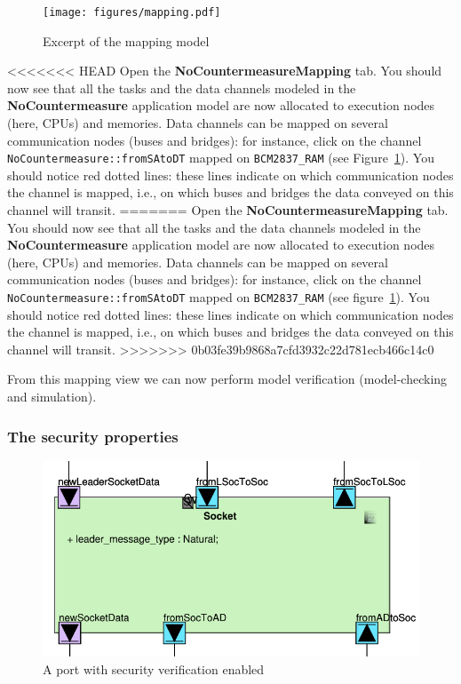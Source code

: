 \documentclass{article}
\begin{document}
\begin{figure}
	\centering
	\texttt{[image: figures/mapping.pdf]}
	\caption{Excerpt of the mapping model}
	\label{fig:rovermapping}
\end{figure}
<<<<<<< HEAD
Open the \textbf{NoCountermeasureMapping} tab. You should now see that all the tasks and the data channels modeled in the \textbf{NoCountermeasure} application model are now allocated to execution nodes (here, CPUs) and memories. Data channels can be mapped on several communication nodes (buses and bridges): for instance, click on the channel \texttt{NoCountermeasure::fromSAtoDT} mapped on \texttt{BCM2837\_RAM} (see Figure~\ref{fig:rovermapping}). You should notice red dotted lines: these lines indicate on which communication nodes the channel is mapped, i.e., on which buses and bridges the data conveyed on this channel will transit.
=======
Open the \textbf{NoCountermeasureMapping} tab. You should now see that all the tasks and the data channels modeled in the \textbf{NoCountermeasure} application model are now allocated to execution nodes (here, CPUs) and memories. Data channels can be mapped on several communication nodes (buses and bridges): for instance, click on the channel \texttt{NoCountermeasure::fromSAtoDT} mapped on \texttt{BCM2837\_RAM} (see figure~\ref{fig:rovermapping}). You should notice red dotted lines: these lines indicate on which communication nodes the channel is mapped, i.e., on which buses and bridges the data conveyed on this channel will transit.
>>>>>>> 0b03fe39b9868a7cfd3932c22d781ecb466c14c0

From this mapping view we can now perform model verification (model-checking and simulation).

\subsubsection{The security properties}

\begin{figure}
	\centering
	\includegraphics[width=.75\textwidth]{figures/lock.pdf}
	\caption{A port with security verification enabled}
	\label{fig:lock}
\end{figure}
\end{document}
